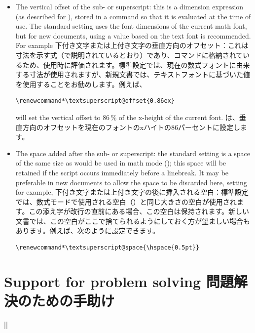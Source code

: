 \documentclass{ltxguide}
\newcommand\jpnewline{\vspace{3pt}\newline}
\begin{document}
\begin{itemize}
  \item The vertical offset of the sub- or superscript: this is a dimension
    expression (as described for ), stored in a command so that
    it is evaluated at the time of use. The standard setting
    uses the font dimensions of the current math font, but for new documents,
    using a value based on the text font is recommended. For example
    \jpnewline
    下付き文字または上付き文字の垂直方向のオフセット：これは寸法を示す式（で説明されているとおり）であり、コマンドに格納されているため、使用時に評価されます。標準設定では、現在の数式フォントに由来する寸法が使用されますが、新規文書では、テキストフォントに基づいた値を使用することをお勧めします。例えば、
    \begin{Verbatim}[gobble = 6]
      \renewcommand*\textsuperscript@offset{0.86ex}
    \end{Verbatim}
    will set the vertical offset to $86\,\mathrm{\%}$ of the x-height of the
    current  font.
    \jpnewline
   は、垂直方向のオフセットを現在のフォントのxハイトの$86$パーセントに設定します。
  \item The space added after the sub- or superscript: the standard setting is
    a space of the same size as would be used in math mode
    (); this space will be retained if the script occurs
    immediately before a linebreak. It may be preferable in new documents
    to allow the space to be discarded here, setting for example,
     \jpnewline
     下付き文字または上付き文字の後に挿入される空白：標準設定では、数式モードで使用される空白（）と同じ大きさの空白が使用されます。この添え字が改行の直前にある場合、この空白は保持されます。新しい文書では、この空白がここで捨てられるようにしておく方が望ましい場合もあります。例えば、次のように設定できます。
    \begin{Verbatim}[gobble = 6]
      \renewcommand*\textsuperscript@space{\hspace{0.5pt}}
    \end{Verbatim}
\end{itemize}

\section{Support for problem solving
問題解決のための手助け}

\begin{decl}
  |\listfiles| 
\end{decl}
\end{document}
